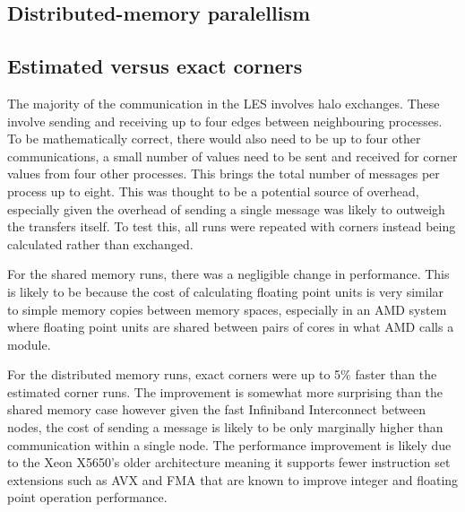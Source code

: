 \subsection{Distributed-memory paralellism}


\subsection{Estimated versus exact corners}

The majority of the communication in the LES involves halo exchanges. These
involve sending and receiving up to four edges between neighbouring processes.
To be mathematically correct, there would also need to be up to four other
communications, a small number of values need to be sent and received for corner
values from four other processes. This brings the total number of messages per
process up to eight. This was thought to be a potential source of overhead,
especially given the overhead of sending a single message was likely to outweigh
the transfers itself. To test this, all runs were repeated with corners instead
being calculated rather than exchanged.

For the shared memory runs, there was a negligible change in performance. This
is likely to be because the cost of calculating floating point units is very
similar to simple memory copies between memory spaces, especially in an AMD
system where floating point units are shared between pairs of cores in what AMD
calls a module.

For the distributed memory runs, exact corners were up to 5\% faster than the
estimated corner runs. The improvement is somewhat more surprising than the
shared memory case however given the fast Infiniband Interconnect between nodes,
the cost of sending a message is likely to be only marginally higher than
communication within a single node. The performance improvement is likely due to
the Xeon X5650's older architecture meaning it supports fewer instruction set
extensions such as AVX and FMA that are known to improve integer and floating
point operation performance.
